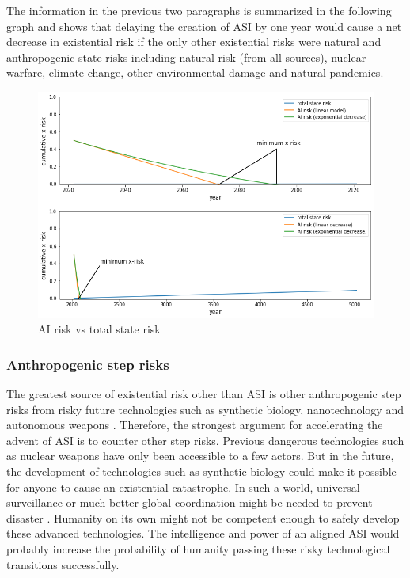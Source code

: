 \documentclass{article}
\begin{document}
The information in the previous two paragraphs is summarized in the following graph and shows that delaying the creation of ASI by one year would cause a net decrease in existential risk if the only other existential risks were natural and anthropogenic state risks including natural risk (from all sources), nuclear warfare, climate change, other environmental damage and natural pandemics.

\begin{figure}[t]
\includegraphics[width=12cm]{ai-risk-vs-state-risk-2}
\centering
\caption{AI risk vs total state risk}
\end{figure}

\vspace{5mm}

\subsubsection{Anthropogenic step risks}

The greatest source of existential risk other than ASI is other anthropogenic step risks from risky future technologies such as synthetic biology, nanotechnology and autonomous weapons \cite{theprecipice, globalcatastrophicriskssurvey}. Therefore, the strongest argument for accelerating the advent of ASI is to counter other step risks. Previous dangerous technologies such as nuclear weapons have only been accessible to a few actors. But in the future, the development of technologies such as synthetic biology could make it possible for anyone to cause an existential catastrophe. In such a world, universal surveillance or much better global coordination might be needed to prevent disaster \cite{vulnerable}. Humanity on its own might not be competent enough to safely develop these advanced technologies. The intelligence and power of an aligned ASI would probably increase the probability of humanity passing these risky technological transitions successfully.
\end{document}
